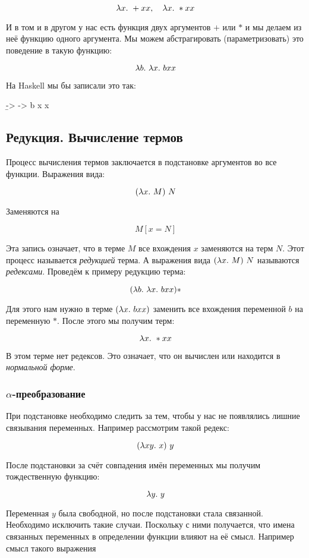 \[\lambda x .\  +xx, \quad \lambda x .\  *xx\]

И в том и в другом у нас есть функция двух аргументов $+$ или $*$ и мы
делаем из неё функцию одного аргумента. Мы можем абстрагировать
(параметризовать) это поведение в такую функцию:

\[\lambda b.\  \lambda x.\  b xx\]

На Haskell мы бы записали это так:


\begin{code}
\b -> \x -> b x x
\end{code}

\subsection{Редукция. Вычисление термов}

Процесс вычисления термов заключается в подстановке аргументов во все
функции. Выражения вида:

\[(\lambda x .\  M)\ N\]

Заменяются на

\[M[x = N]\]

Эта запись означает, что в терме $M$ все вхождения $x$ заменяются на
терм $N$. Этот процесс называется \emph{редукцией} терма. А выражения
вида $(\lambda x .\  M)\ N$ называются \emph{редексами}. Проведём к
примеру редукцию терма:

\[(\lambda b.\  \lambda x.\  b xx) *\]

Для этого нам нужно в терме $(\lambda x.\  b xx)$ заменить все вхождения
переменной $b$ на переменную $*$. После этого мы получим терм:

\[\lambda x .\  * xx\]

В этом терме нет редексов. Это означает, что он вычислен или находится в
\emph{нормальной форме}.

\subsubsection{$\alpha$-преобразование}

При подстановке необходимо следить за тем, чтобы у нас не появлялись
лишние связывания переменных. Например рассмотрим такой редекс:

\[(\lambda x y .\  x)\ y\]

После подстановки за счёт совпадения имён переменных мы получим
тождественную функцию:

\[\lambda y .\  y\]

Переменная $y$ была свободной, но после подстановки стала связанной.
Необходимо исключить такие случаи. Поскольку с ними получается, что
имена связанных переменных в определении функции влияют на её смысл.
Например смысл такого выражения

